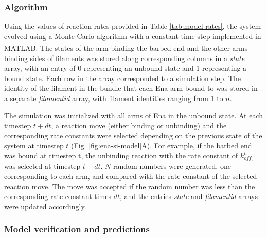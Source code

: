 \subsubsection{Algorithm}\label{ena-si-algorithm}
Using the values of reaction rates provided in Table \ref{tab:model-rates}, the system evolved using a Monte Carlo algorithm with a constant time-step implemented in MATLAB\textsuperscript{\textregistered}. The states of the arm binding the barbed end and the other arms binding sides of filaments was stored along corresponding columns in a \textit{state} array, with an entry of 0 representing an unbound state and 1 representing a bound state. Each row in the array corresponded to a simulation step. The identity of the filament in the bundle that each Ena arm bound to was stored in a separate \textit{filamentid} array, with filament identities ranging from 1 to $n$. 

The simulation was initialized with all arms of Ena in the unbound state. At each timestep $t + dt$, a reaction move (either binding or unbinding) and the corresponding rate constants were selected depending on the previous state of the system at timestep $t$ (Fig. \ref{fig:ena-si-model}A). For example, if the barbed end was bound at timestep t, the unbinding reaction with the rate constant of $k_{off,1}^{t}$ was selected at timestep $t + dt$. $N$ random numbers were generated, one corresponding to each arm, and compared with the rate constant of the selected reaction move. The move was accepted if the random number was less than the corresponding rate constant times $dt$, and the entries \textit{state} and \textit{filamentid} arrays were updated accordingly.

\subsubsection{Model verification and predictions}\label{ena-si-predictions}

